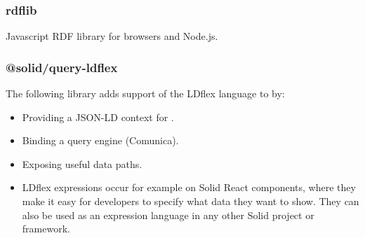 \subsubsection{rdflib}

Javascript RDF library for browsers and Node.js. 

\subsubsection{@solid/query-ldflex}

The following library adds support of the LDflex language to \solid{} by:

\begin{itemize}
	\item Providing a JSON-LD context for \solid{}.
    \item Binding a query engine (Comunica).
    \item Exposing useful data paths.
    \item LDflex expressions occur for example on Solid React components, where they make it easy for developers to specify what data they want to show. They can also be used as an expression language in any other Solid project or framework.
\end{itemize}
